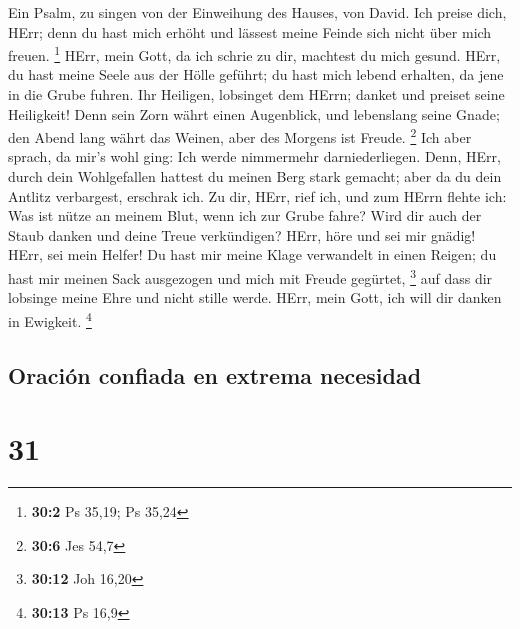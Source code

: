  Ein Psalm, zu singen von der Einweihung des Hauses, von
David.  Ich preise dich, HErr; denn du hast mich erhöht
und lässest meine Feinde sich nicht über mich freuen. \footnote{\textbf{30:2}
  Ps 35,19; Ps 35,24}  HErr, mein Gott, da ich schrie zu
dir, machtest du mich gesund.  HErr, du hast meine Seele
aus der Hölle geführt; du hast mich lebend erhalten, da jene in die
Grube fuhren.  Ihr Heiligen, lobsinget dem HErrn; danket
und preiset seine Heiligkeit!  Denn sein Zorn währt einen
Augenblick, und lebenslang seine Gnade; den Abend lang währt das Weinen,
aber des Morgens ist Freude. \footnote{\textbf{30:6} Jes 54,7}
 Ich aber sprach, da mir's wohl ging: Ich werde nimmermehr
darniederliegen.  Denn, HErr, durch dein Wohlgefallen
hattest du meinen Berg stark gemacht; aber da du dein Antlitz
verbargest, erschrak ich.  Zu dir, HErr, rief ich, und zum
HErrn flehte ich:  Was ist nütze an meinem Blut, wenn ich
zur Grube fahre? Wird dir auch der Staub danken und deine Treue
verkündigen?  HErr, höre und sei mir gnädig! HErr, sei
mein Helfer!  Du hast mir meine Klage verwandelt in einen
Reigen; du hast mir meinen Sack ausgezogen und mich mit Freude gegürtet,
\footnote{\textbf{30:12} Joh 16,20}  auf dass dir
lobsinge meine Ehre und nicht stille werde. HErr, mein Gott, ich will
dir danken in Ewigkeit. \footnote{\textbf{30:13} Ps 16,9}

\hypertarget{oraciuxf3n-confiada-en-extrema-necesidad}{%
\subsection{Oración confiada en extrema
necesidad}\label{oraciuxf3n-confiada-en-extrema-necesidad}}

\hypertarget{section-30}{%
\section{31}\label{section-30}}

